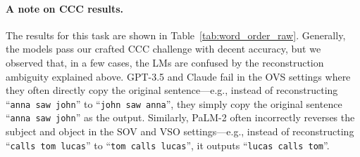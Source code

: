 \paragraph{A note on CCC results.}
The results for this task are shown in Table~\ref{tab:word_order_raw}. Generally, the models pass our crafted CCC challenge with decent accuracy, but we observed that, in a few cases, the LMs are confused by the reconstruction ambiguity explained above. GPT-3.5 and Claude fail in the OVS settings where they often directly copy the original sentence---e.g., instead of reconstructing ``\texttt{anna saw john}'' to ``\texttt{john saw anna}'', they simply copy the original sentence ``\texttt{anna saw john}'' as the output. Similarly, PaLM-2 often incorrectly reverses the subject and object in the SOV and VSO settings---e.g., instead of reconstructing ``\texttt{calls tom lucas}'' to ``\texttt{tom calls lucas}'', it outputs ``\texttt{lucas calls tom}''. 



